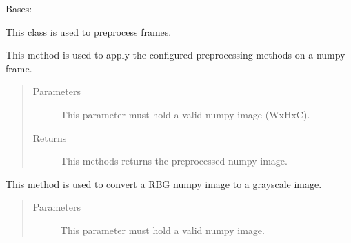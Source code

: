 \documentclass[letterpaper,10pt,english,openany,oneside]{sphinxmanual}
\begin{document}
\begin{fulllineitems}
\label{\detokenize{PreProcessing:cmc.PreProcessing.PreProcessing}}
Bases: 

This class is used to pre\sphinxhyphen{}process frames.

\begin{fulllineitems}
\label{\detokenize{PreProcessing:cmc.PreProcessing.PreProcessing.applyTransformOnImg}}
This method is used to apply the configured pre\sphinxhyphen{}processing methods on a numpy frame.
\begin{quote}\begin{description}
\item[{Parameters}] \leavevmode
{} \textendash{} This parameter must hold a valid numpy image (WxHxC).

\item[{Returns}] \leavevmode
This methods returns the preprocessed numpy image.

\end{description}\end{quote}

\end{fulllineitems}


\begin{fulllineitems}
\label{\detokenize{PreProcessing:cmc.PreProcessing.PreProcessing.convertRGB2Gray}}
This method is used to convert a RBG numpy image to a grayscale image.
\begin{quote}\begin{description}
\item[{Parameters}] \leavevmode
{} \textendash{} This parameter must hold a valid numpy image.


\end{description}
\end{quote}
\end{fulllineitems}
\end{fulllineitems}
\end{document}
